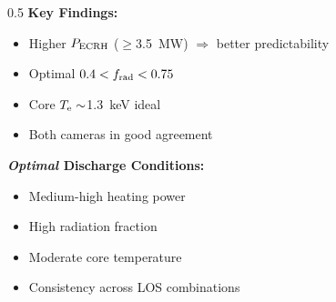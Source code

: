 \begin{frame}
\begin{columns}
        \begin{column}{0.5\textwidth}
            \textbf{Key Findings:}
            \begin{itemize}
                \item Higher $P_{\mathrm{ECRH}}$ ($\ge$\SI{3.5}{\mega\watt}) $\Rightarrow$ better predictability
                \item Optimal $0.4<f_{\mathrm{rad}}<0.75$
                \item Core $T_{\mathrm{e}}\sim$\SI{1.3}{\kilo\electronvolt} ideal
                \item Both cameras in good agreement
            \end{itemize}

            \vspace{0.5em}
            \textbf{\textit{Optimal} Discharge Conditions:}
            \begin{itemize}
                \item Medium-high heating power
                \item High radiation fraction
                \item Moderate core temperature
                \item Consistency across LOS combinations
            \end{itemize}
        \end{column}
    \end{columns}

\end{frame}

